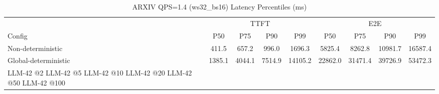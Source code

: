 \begin{table}[htbp]
\centering
\caption{ARXIV QPS=1.4 (ws32_bs16) Latency Percentiles (ms)}
\label{tab:arxiv_qps1.4_ws32_bs16}
\begin{tabular}{l|cccc|cccc}
\toprule
& \multicolumn{4}{c|}{TTFT} & \multicolumn{4}{c}{E2E} \\
Config & P50 & P75 & P90 & P99 & P50 & P75 & P90 & P99 \\
\midrule
Non-deterministic & 411.5 & 657.2 & 996.0 & 1696.3 & 5825.4 & 8262.8 & 10981.7 & 16587.4 \\
Global-deterministic & 1385.1 & 4044.1 & 7514.9 & 14105.2 & 22862.0 & 31471.4 & 39726.9 & 53472.3 \\
LLM-42 @2%
LLM-42 @5%
LLM-42 @10%
LLM-42 @20%
LLM-42 @50%
LLM-42 @100%
\bottomrule
\end{tabular}
\end{table}
